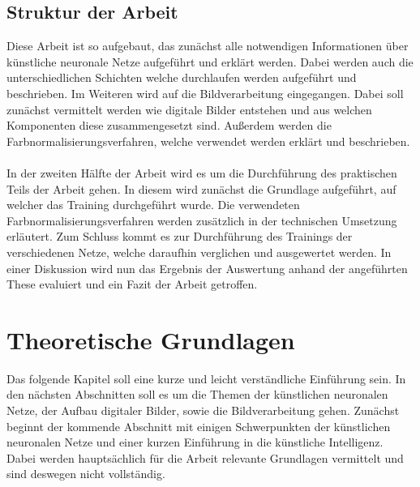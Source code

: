 \documentclass[a4paper,12pt,oneside]{article}
\begin{document}
  \subsection{Struktur der Arbeit}\label{Struktur}
Diese Arbeit ist so aufgebaut, das zunächst alle notwendigen Informationen über künstliche neuronale Netze aufgeführt und erklärt werden. Dabei werden auch die unterschiedlichen Schichten welche durchlaufen werden aufgeführt und beschrieben. Im Weiteren wird auf die Bildverarbeitung eingegangen. Dabei soll zunächst vermittelt werden wie digitale Bilder entstehen und aus welchen Komponenten diese zusammengesetzt sind. Außerdem werden die Farbnormalisierungsverfahren, welche verwendet werden erklärt und beschrieben.\\\\
In der zweiten Hälfte der Arbeit wird es um die Durchführung des praktischen Teils der Arbeit gehen. In diesem wird zunächst die Grundlage aufgeführt, auf welcher das Training durchgeführt wurde. Die verwendeten Farbnormalisierungsverfahren werden zusätzlich in der technischen Umsetzung erläutert. Zum Schluss kommt es zur Durchführung des Trainings der verschiedenen Netze, welche daraufhin verglichen und ausgewertet werden. In einer Diskussion wird nun das Ergebnis der Auswertung anhand der angeführten These evaluiert und ein Fazit der Arbeit getroffen.
  \newpage
  \section{Theoretische Grundlagen}\label{s.grundlagen}
Das folgende Kapitel soll eine kurze und leicht verständliche Einführung sein. In den nächsten Abschnitten soll es um die Themen der künstlichen neuronalen Netze, der Aufbau digitaler Bilder, sowie die Bildverarbeitung gehen. Zunächst beginnt der kommende Abschnitt mit einigen Schwerpunkten der künstlichen neuronalen Netze und einer kurzen Einführung in die künstliche Intelligenz. Dabei werden hauptsächlich für die Arbeit relevante Grundlagen vermittelt und sind deswegen nicht vollständig. 
\end{document}
